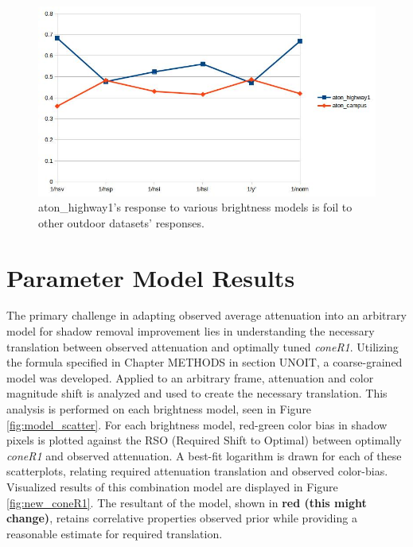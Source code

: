 \documentclass[12pt]{report}
\begin{document}
\begin{figure}
\centering
  \includegraphics[width=1\linewidth]{figures/brightness/db/highway1_reciprocal.jpg}
\caption{aton\_highway1's response to various brightness models is foil to other outdoor datasets' responses.}
\label{fig:highway1_reciprocal}
\end{figure}

\section{Parameter Model Results}

The primary challenge in adapting observed average attenuation into an arbitrary model for shadow removal improvement lies in understanding the necessary translation between observed attenuation and optimally tuned \textit{coneR1}. Utilizing the formula specified in Chapter METHODS in section UNOIT, a coarse-grained model was developed. Applied to an arbitrary frame, attenuation and color magnitude shift is analyzed and used to create the necessary translation. This analysis is performed on each brightness model, seen in Figure \ref{fig:model_scatter}. For each brightness model, red-green color bias in shadow pixels is plotted against the RSO (Required Shift to Optimal) between optimally \textit{coneR1} and observed attenuation. A best-fit logarithm is drawn for each of these scatterplots, relating required attenuation translation and observed color-bias. Visualized results of this combination model are displayed in Figure \ref{fig:new_coneR1}. The resultant of the model, shown in \textbf{red (this might change)}, retains correlative properties observed prior while providing a reasonable estimate for required translation.
\end{document}
